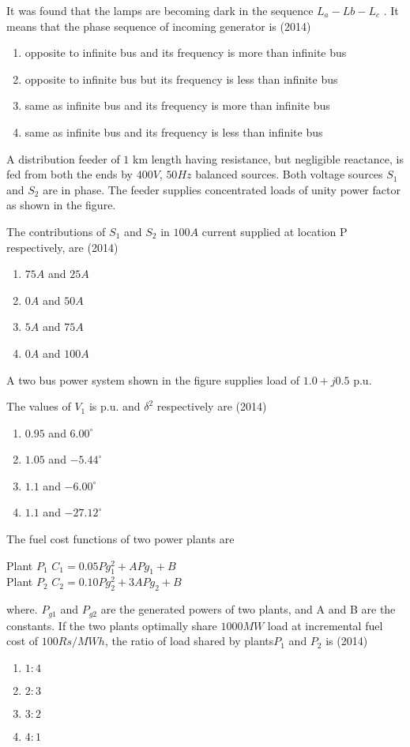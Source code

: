 It was found that the lamps are becoming dark in the sequence $L_a -Lb -L_c$ . It means that the phase
sequence of incoming generator is
\hfill{(2014)}
                \begin{enumerate}
                
			\item opposite to infinite bus and its frequency is more than infinite bus
			\item opposite to infinite bus but its frequency is less than infinite bus
			\item same as infinite bus and its frequency is more than infinite bus
			\item same as infinite bus and its frequency is less than infinite bus
        	
         \end{enumerate}		
	\item  A distribution feeder of $1$ km length having resistance, but negligible reactance, is fed from both the
ends by $400V$, $50 Hz$ balanced sources. Both voltage sources $S_1$ and $S_2$ are in phase. The feeder
supplies concentrated loads of unity power factor as shown in the figure.


The contributions of $S_1$ and $S_2$ in $100 A$ current supplied at location P respectively, are
\hfill{(2014)}
		\begin{enumerate}
			\item $75 A$ and $25 A$
			\item $0 A$ and $50 A$
			\item $5 A$ and $75 A$
			\item$ 0A$ and $100A$
        	\end{enumerate}	
	\item A two bus power system shown in the figure supplies load of $1.0+j0.5$ p.u.
		

 The values of $V_1$ is p.u. and $\delta ^2$ respectively are
 \hfill{(2014)}
		\begin{enumerate}
			\item $0.95$ and $6.00^{\circ}$
			\item $1.05$ and $-5.44^{\circ}$
			\item $1.1$ and $-6.00^{\circ}$
			\item $1.1$ and $-27.12^{\circ}$
        	\end{enumerate}	
    \item The fuel cost functions of two power plants are 
    \begin{center}
          Plant $P_1$    $C_1=0.05Pg_1^2+APg_1+B$\\
         Plant $P_2$    $C_2=0.10Pg_2^2+3APg_2+B$\\
    \end{center}
    where. $P_{g1}$ and $P_{g2}$ are the generated powers of two plants, and A and B are the constants. If the two plants optimally share $1000 MW$ load at incremental fuel cost of $100Rs/MWh$, the ratio of load shared by plants$P_1$ and $P_2$ is
    \hfill{(2014)}
    
		\begin{enumerate}
			\item $1:4$
			\item $2:3$
			\item $3:2$
			\item $4:1$
        	\end{enumerate}	

